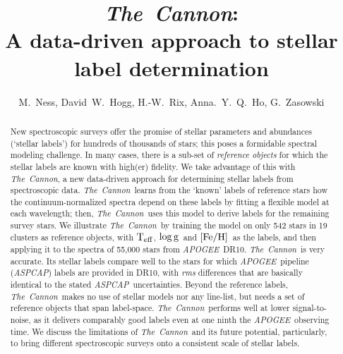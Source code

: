 \documentclass[12pt, preprint]{aastex}
\newcommand{\tc}{\textsl{The~Cannon}}
\newcommand{\apogee}{\textsl{APOGEE}}
\newcommand{\aspcap}{\textsl{ASPCAP}}
\newcommand{\teff}{\mbox{$\rm T_{eff}$}}
\newcommand{\feh}{\mbox{$\rm [Fe/H]$}}
\newcommand{\logg}{\mbox{$\rm \log g$}}
\begin{document}
\title{\tc:\\ A data-driven approach to stellar label determination}
\author{M.~Ness,  
David~W.~Hogg, 
H.-W.~Rix, 
Anna.~Y.~Q.~Ho, 
G.~Zasowski}

\begin{abstract}%
New spectroscopic surveys offer the promise of stellar
parameters and abundances (`stellar labels') for hundreds of thousands
of stars; this poses a formidable spectral modeling challenge. In many cases, there is a sub-set of \emph{reference
objects} for which the stellar labels are known with high(er)
fidelity. We take advantage of this with \tc , a new data-driven
approach for determining stellar labels from spectroscopic data.
\tc\ learns from the `known' labels of reference stars 
how the continuum-normalized spectra depend on these labels
by fitting a flexible model at each wavelength;
then,  \tc\ uses this model to derive labels for the remaining survey stars.
We illustrate \tc\ by training the model 
 on only 542 stars in 19 clusters as reference objects, with \teff, \logg\ and \feh\ as the labels,
and then applying it to the spectra of 55,000 stars from
\apogee\ DR10.
\tc\ is very accurate. Its stellar labels compare well to the
stars for which \apogee\ pipeline (\aspcap) labels are provided in DR10, with 
\textit{rms} differences that are basically identical to the stated \aspcap\ uncertainties.
Beyond the reference labels, \tc\ makes no use of
stellar models nor any line-list, but needs a set of reference objects that span label-space.
\tc\  performs well at lower signal-to-noise, as it delivers comparably 
good labels even at one ninth the \apogee\ observing time.
We discuss the limitations of \tc\ and its future potential, particularly, 
to bring different spectroscopic surveys onto a consistent
scale of stellar labels.
\end{abstract}
\end{document}
